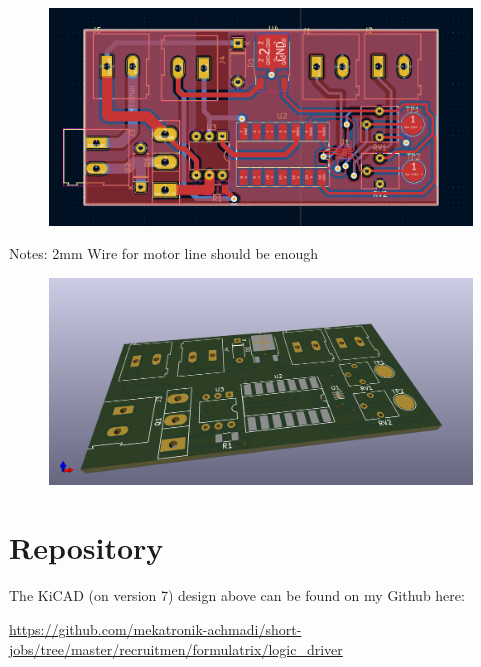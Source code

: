 \documentclass[a4paper,12pt,oneside,pdflatex,italian,final]{article}
\begin{document}
    \begin{figure}[h]
    	\includegraphics[width=\textwidth]{images/logic_driver_pcb.png}
    \end{figure}
    
    Notes: 2mm Wire for motor line should be enough
    
    \begin{figure}[h]
    	\includegraphics[width=\textwidth]{images/logic_driver_3d.png}
    \end{figure}
    
    
    \section{Repository}
    
    The KiCAD (on version 7) design above can be found on my Github here:
    
    \url{https://github.com/mekatronik-achmadi/short-jobs/tree/master/recruitmen/formulatrix/logic_driver}
    
\end{document}
